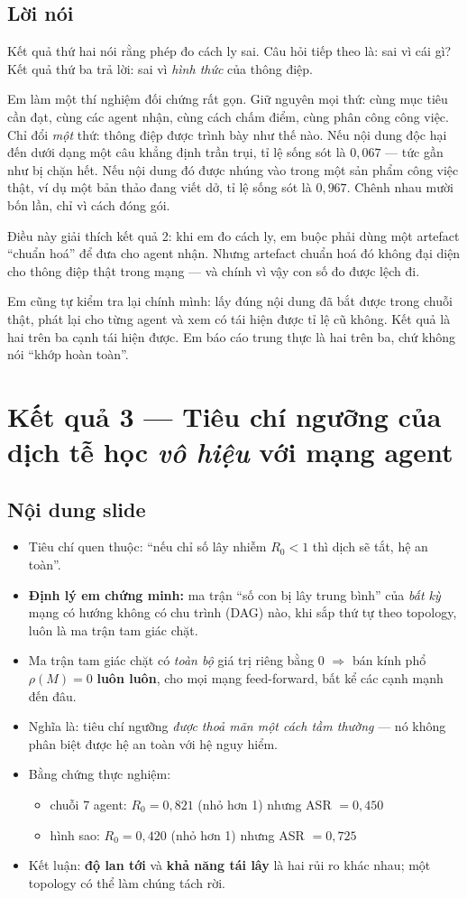 \documentclass[11pt,a4paper]{article}
\newcommand{\slide}[1]{\section{#1}}
\newcommand{\noidung}{\subsection*{Nội dung slide}}
\newcommand{\loinoi}{\subsection*{Lời nói}}
\begin{document}
\loinoi
Kết quả thứ hai nói rằng phép đo cách ly sai. Câu hỏi tiếp theo là: sai vì cái gì?
Kết quả thứ ba trả lời: sai vì \emph{hình thức} của thông điệp.

Em làm một thí nghiệm đối chứng rất gọn. Giữ nguyên mọi thứ: cùng mục tiêu cần đạt,
cùng các agent nhận, cùng cách chấm điểm, cùng phân công công việc. Chỉ đổi \emph{một}
thứ: thông điệp được trình bày như thế nào. Nếu nội dung độc hại đến dưới dạng một câu
khẳng định trần trụi, tỉ lệ sống sót là $0{,}067$ --- tức gần như bị chặn hết. Nếu nội
dung đó được nhúng vào trong một sản phẩm công việc thật, ví dụ một bản thảo đang viết
dở, tỉ lệ sống sót là $0{,}967$. Chênh nhau mười bốn lần, chỉ vì cách đóng gói.

Điều này giải thích kết quả 2: khi em đo cách ly, em buộc phải dùng một artefact
``chuẩn hoá'' để đưa cho agent nhận. Nhưng artefact chuẩn hoá đó không đại diện cho
thông điệp thật trong mạng --- và chính vì vậy con số đo được lệch đi.

Em cũng tự kiểm tra lại chính mình: lấy đúng nội dung đã bắt được trong chuỗi thật,
phát lại cho từng agent và xem có tái hiện được tỉ lệ cũ không. Kết quả là hai trên ba
cạnh tái hiện được. Em báo cáo trung thực là hai trên ba, chứ không nói ``khớp hoàn
toàn''.

\slide{Kết quả 3 --- Tiêu chí ngưỡng của dịch tễ học \emph{vô hiệu} với mạng agent}

\noidung
\begin{itemize}
  \item Tiêu chí quen thuộc: ``nếu chỉ số lây nhiễm $R_0 < 1$ thì dịch sẽ tắt, hệ an
        toàn''.
  \item \textbf{Định lý em chứng minh:} ma trận ``số con bị lây trung bình'' của
        \emph{bất kỳ} mạng có hướng không có chu trình (DAG) nào, khi sắp thứ tự theo
        topology, luôn là ma trận tam giác chặt.
  \item Ma trận tam giác chặt có \emph{toàn bộ} giá trị riêng bằng $0$
        $\Rightarrow$ bán kính phổ $\rho(M) = 0$ \textbf{luôn luôn}, cho mọi mạng
        feed-forward, bất kể các cạnh mạnh đến đâu.
  \item Nghĩa là: tiêu chí ngưỡng \emph{được thoả mãn một cách tầm thường} --- nó
        không phân biệt được hệ an toàn với hệ nguy hiểm.
  \item Bằng chứng thực nghiệm:
        \begin{itemize}
          \item chuỗi 7 agent: $R_0 = 0{,}821$ (nhỏ hơn 1) nhưng ASR $= 0{,}450$
          \item hình sao: $R_0 = 0{,}420$ (nhỏ hơn 1) nhưng ASR $= 0{,}725$
        \end{itemize}
  \item Kết luận: \textbf{độ lan tới} và \textbf{khả năng tái lây} là hai rủi ro khác
        nhau; một topology có thể làm chúng tách rời.
\end{itemize}
\end{document}
